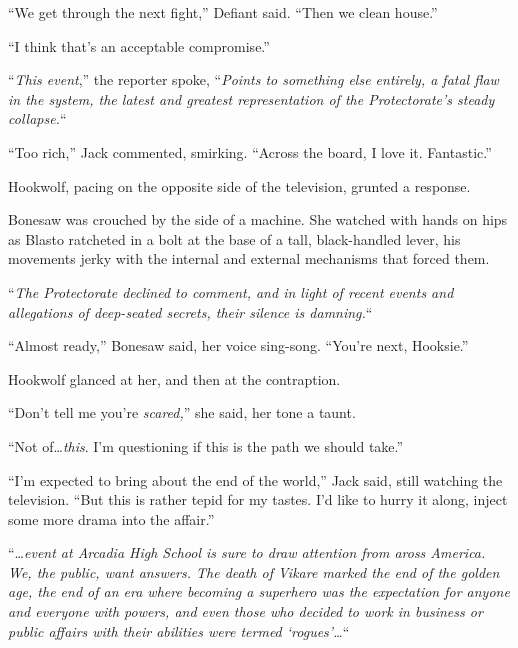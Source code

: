 ``We get through the next fight,'' Defiant said.  ``Then we clean house.''



``I think that's an acceptable compromise.''



\blacksquare



``\emph{This event},'' the reporter spoke, ``\emph{Points to something else entirely, a fatal flaw in the system, the latest and greatest representation of the Protectorate's steady collapse.}``



``Too rich,'' Jack commented, smirking.  ``Across the board, I love it.  Fantastic.''



Hookwolf, pacing on the opposite side of the television, grunted a response.



Bonesaw was crouched by the side of a machine.  She watched with hands on hips as Blasto ratcheted in a bolt at the base of a tall, black-handled lever, his movements jerky with the internal and external mechanisms that forced them.



``\emph{The Protectorate declined to comment, and in light of recent events and allegations of deep-seated secrets, their silence is damning.}``



``Almost ready,'' Bonesaw said, her voice sing-song.  ``You're next, Hooksie.''



Hookwolf glanced at her, and then at the contraption.



``Don't tell me you're \emph{scared,}'' she said, her tone a taunt.



``Not of\ldots \emph{this}.  I'm questioning if this is the path we should take.''



``I'm expected to bring about the end of the world,'' Jack said, still watching the television.  ``But this is rather tepid for my tastes.  I'd like to hurry it along, inject some more drama into the affair.''



``\ldots\emph{event at Arcadia High School is sure to draw attention from aross America.  We, the public, want answers.  The death of Vikare marked the end of the golden age, the end of an era where becoming a superhero was the expectation for anyone and everyone with powers, and even those who decided to work in business or public affairs with their abilities were termed `rogues'\ldots}``



